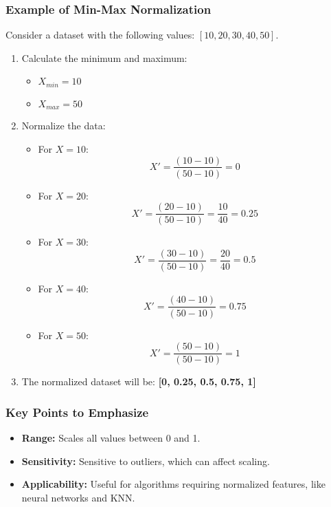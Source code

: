 \documentclass[aspectratio=169]{beamer}
\begin{document}
\begin{frame}[fragile]
    \frametitle{Example of Min-Max Normalization}
    Consider a dataset with the following values: \([10, 20, 30, 40, 50]\).
    
    \begin{enumerate}
        \item Calculate the minimum and maximum:
        \begin{itemize}
            \item \( X_{min} = 10 \)
            \item \( X_{max} = 50 \)
        \end{itemize}
        
        \item Normalize the data:
        \begin{itemize}
            \item For \( X = 10 \): 
                \[
                X' = \frac{(10 - 10)}{(50 - 10)} = 0
                \]
            \item For \( X = 20 \): 
                \[
                X' = \frac{(20 - 10)}{(50 - 10)} = \frac{10}{40} = 0.25
                \]
            \item For \( X = 30 \): 
                \[
                X' = \frac{(30 - 10)}{(50 - 10)} = \frac{20}{40} = 0.5
                \]
            \item For \( X = 40 \): 
                \[
                X' = \frac{(40 - 10)}{(50 - 10)} = 0.75
                \]
            \item For \( X = 50 \): 
                \[
                X' = \frac{(50 - 10)}{(50 - 10)} = 1
                \]
        \end{itemize}
        
        \item The normalized dataset will be: \textbf{[0, 0.25, 0.5, 0.75, 1]}
    \end{enumerate}
\end{frame}

\begin{frame}[fragile]
    \frametitle{Key Points to Emphasize}
    \begin{itemize}
        \item \textbf{Range:} Scales all values between 0 and 1.
        \item \textbf{Sensitivity:} Sensitive to outliers, which can affect scaling.
        \item \textbf{Applicability:} Useful for algorithms requiring normalized features, like neural networks and KNN.
    \end{itemize}
\end{frame}
\end{document}
